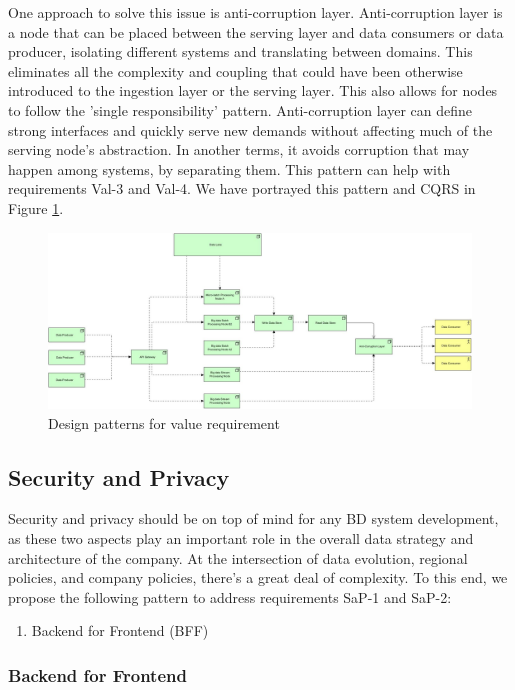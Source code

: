 \documentclass{bmcart}
\begin{document}
One approach to solve this issue is anti-corruption layer. Anti-corruption layer is a node that can be placed between the serving layer and data consumers or data producer, isolating different systems and translating between domains. This eliminates all the complexity and coupling that could have been otherwise introduced to the ingestion layer or the serving layer. This also allows for nodes to follow the 'single responsibility' pattern. Anti-corruption layer can define strong interfaces and quickly serve new demands without affecting much of the serving node's abstraction. In another terms, it avoids corruption that may happen among systems, by separating them. This pattern can help with requirements Val-3 and Val-4. We have portrayed this pattern and CQRS in Figure \ref{fig:Value Requirements}.

\begin{figure}[h]
    \includegraphics[width=12cm]{Media/Value Requirement.jpg}
    \caption[]{Design patterns for value requirement }
    \label{fig:Value Requirements}
\end{figure}

\subsection{Security and Privacy}

Security and privacy should be on top of mind for any BD system development, as these two aspects play an important role in the overall data strategy and architecture of the company. At the intersection of data evolution, regional policies, and company policies, there's a great deal of complexity. To this end, we propose the following pattern to address requirements SaP-1 and SaP-2:

\begin{enumerate}
  \item Backend for Frontend (BFF)
\end{enumerate}

\subsubsection{Backend for Frontend}
\end{document}
